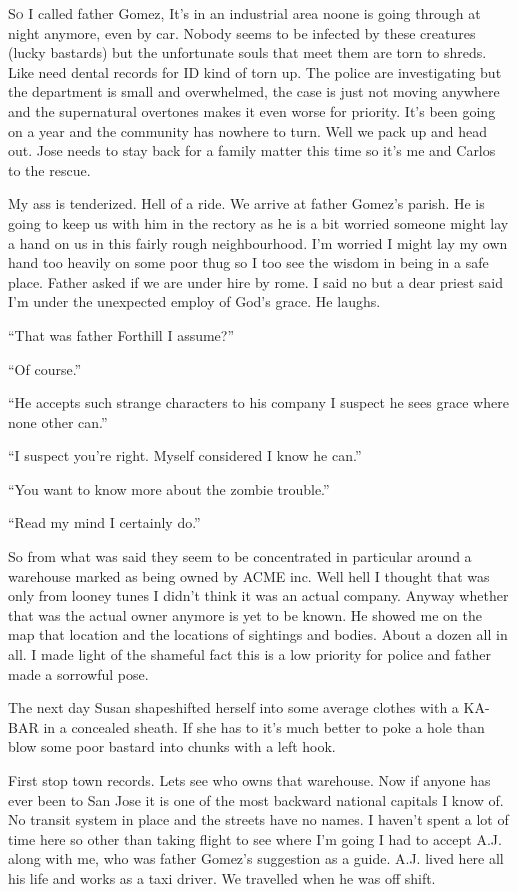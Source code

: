\lettrine[lines=2,lraise=0]{S}o I called father Gomez, It's in an industrial area noone is going through at night anymore, even by car. Nobody seems to be infected by these creatures (lucky bastards) but the unfortunate souls that meet them are torn to shreds. Like need dental records for ID kind of torn up. The police are investigating but the department is small and overwhelmed, the case is just not moving anywhere and the supernatural overtones makes it even worse for priority. It's been going on a year and the community has nowhere to turn. Well we pack up and head out. Jose needs to stay back for a family matter this time so it's me and Carlos to the rescue.

My ass is tenderized. Hell of a ride. We arrive at father Gomez's parish. He is going to keep us with him in the rectory as he is a bit worried someone might lay a hand on us in this fairly rough neighbourhood. I'm worried I might lay my own hand too heavily on some poor thug so I too see the wisdom in being in a safe place. Father asked if we are under hire by rome. I said no but a dear priest said I'm under the unexpected employ of God's grace. He laughs.

``That was father Forthill I assume?''

``Of course.''

``He accepts such strange characters to his company I suspect he sees grace where none other can.''

``I suspect you're right. Myself considered I know he can.''

``You want to know more about the zombie trouble.''

``Read my mind I certainly do.''

So from what was said they seem to be concentrated in particular around a warehouse marked as being owned by ACME inc. Well hell I thought that was only from looney tunes I didn't think it was an actual company. Anyway whether that was the actual owner anymore is yet to be known. He showed me on the map that location and the locations of sightings and bodies. About a dozen all in all. I made light of the shameful fact this is a low priority for police and father made a sorrowful pose.

The next day Susan shapeshifted herself into some average clothes with a KA-BAR in a concealed sheath. If she has to it's much better to poke a hole than blow some poor bastard into chunks with a left hook.

First stop town records. Lets see who owns that warehouse. Now if anyone has ever been to San Jose it is one of the most backward national capitals I know of. No transit system in place and the streets have no names. I haven't spent a lot of time here so other than taking flight to see where I'm going I had to accept A.J. along with me, who was father Gomez's suggestion as a guide. A.J. lived here all his life and works as a taxi driver. We travelled when he was off shift.

